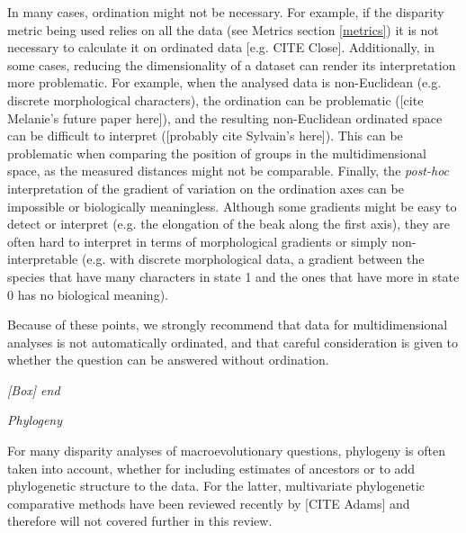 \documentclass[12pt,letterpaper]{article}
\renewcommand{\subsection}[1]{%
\bigskip
\begin{center}
\begin{large}
\normalfont\itshape #1
\end{large}
\end{center}}
\begin{document}
In many cases, ordination might not be necessary.
For example, if the disparity metric being used relies on all the data (see Metrics section \ref{metrics}) it is not necessary to calculate it on ordinated data [e.g. CITE Close].
Additionally, in some cases, reducing the dimensionality of a dataset can render its interpretation more problematic.
For example, when the analysed data is non-Euclidean (e.g. discrete morphological characters), the ordination can be problematic ([cite Melanie's future paper here]), and the resulting non-Euclidean ordinated space can be difficult to interpret ([probably cite Sylvain's here]).
This can be problematic when comparing the position of groups in the multidimensional space, as the measured distances might not be comparable.
Finally, the \textit{post-hoc} interpretation of the gradient of variation on the ordination axes can be impossible or biologically meaningless.
Although some gradients might be easy to detect or interpret (e.g. the elongation of the beak along the first axis), they are often hard to interpret in terms of morphological gradients or simply non-interpretable (e.g. with discrete morphological data, a gradient between the species that have many characters in state 1 and the ones that have more in state 0 has no biological meaning).

Because of these points, we strongly recommend that data for multidimensional analyses is not automatically ordinated, and that careful consideration is given to whether the question can be answered without ordination.
\subsection{[Box] end}

\subsection{Phylogeny}
For many disparity analyses of macroevolutionary questions, phylogeny is often taken into account, whether for including estimates of ancestors or to add phylogenetic structure to the data.
For the latter, multivariate phylogenetic comparative methods have been reviewed recently by [CITE Adams] %
and therefore will not covered further in this review.
\end{document}

